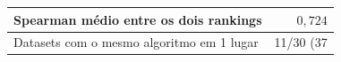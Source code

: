 \begin{tabular}{lr}
\toprule
Spearman médio entre os dois rankings & $0{,}724$ \\
\midrule
Datasets com o mesmo algoritmo em 1\textordmasculine{} lugar & 11/30 (37%
\bottomrule
\end{tabular}

